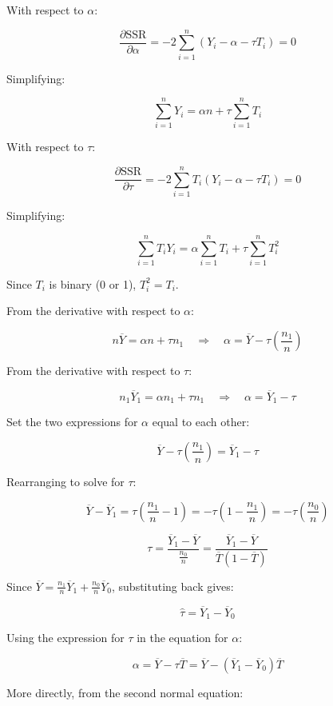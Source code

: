 \documentclass{article}
\begin{document}
With respect to $\alpha$:

\[
\frac{\partial \text{SSR}}{\partial \alpha} = -2 \sum_{i=1}^{n} (Y_i - \alpha - \tau T_i) = 0
\]

Simplifying:

\[
\sum_{i=1}^{n} Y_i = \alpha n + \tau \sum_{i=1}^{n} T_i
\]

With respect to $\tau$:

\[
\frac{\partial \text{SSR}}{\partial \tau} = -2 \sum_{i=1}^{n} T_i (Y_i - \alpha - \tau T_i) = 0
\]

Simplifying:

\[
\sum_{i=1}^{n} T_i Y_i = \alpha \sum_{i=1}^{n} T_i + \tau \sum_{i=1}^{n} T_i^2
\]

Since \( T_i \) is binary (0 or 1), \( T_i^2 = T_i \).

From the derivative with respect to \( \alpha \):

\[
n \overline{Y} = \alpha n + \tau n_1 \quad \Rightarrow \quad \alpha = \overline{Y} - \tau \left( \frac{n_1}{n} \right)
\]

From the derivative with respect to \( \tau \):

\[
n_1 \overline{Y}_{1} = \alpha n_1 + \tau n_1 \quad \Rightarrow \quad \alpha = \overline{Y}_{1} - \tau
\]

Set the two expressions for \( \alpha \) equal to each other:

\[
\overline{Y} - \tau \left( \frac{n_1}{n} \right) = \overline{Y}_{1} - \tau
\]

Rearranging to solve for \( \tau \):

\[
\overline{Y} - \overline{Y}_{1} = \tau \left( \frac{n_1}{n} - 1 \right) = -\tau \left( 1 - \frac{n_1}{n} \right) = -\tau \left( \frac{n_0}{n} \right)
\]

\[
\tau = \frac{\overline{Y}_{1} - \overline{Y}}{\frac{n_0}{n}} = \frac{\overline{Y}_{1} - \overline{Y}}{\overline{T} (1 - \overline{T})}
\]

Since \( \overline{Y} = \frac{n_1}{n} \overline{Y}_{1} + \frac{n_0}{n} \overline{Y}_{0} \), substituting back gives:

\[
\hat{\tau} = \overline{Y}_{1} - \overline{Y}_{0}
\]

Using the expression for \( \tau \) in the equation for \( \alpha \):

\[
\alpha = \overline{Y} - \tau \overline{T} = \overline{Y} - (\overline{Y}_{1} - \overline{Y}_{0}) \overline{T}
\]

More directly, from the second normal equation:
\end{document}
